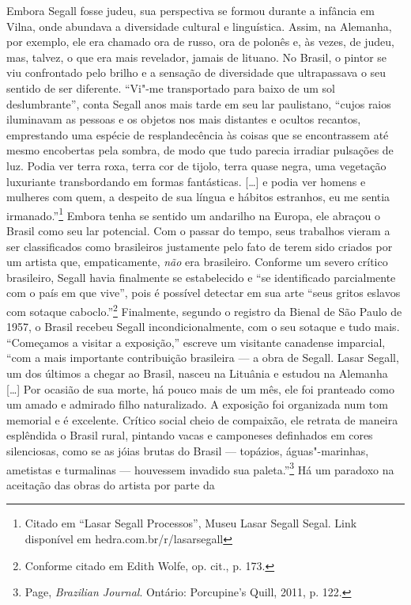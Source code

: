 Embora Segall fosse judeu, sua perspectiva se formou durante a infância
em Vilna, onde abundava a diversidade cultural e linguística. Assim, na
Alemanha, por exemplo, ele era chamado ora de russo, ora de polonês e,
às vezes, de judeu, mas, talvez, o que era mais revelador, jamais de
lituano. No Brasil, o pintor se viu confrontado pelo brilho e a sensação
de diversidade que ultrapassava o seu sentido de ser diferente. ``Vi"-me
transportado para baixo de um sol deslumbrante'', conta Segall anos mais
tarde em seu lar paulistano, ``cujos raios iluminavam as pessoas e os
objetos nos mais distantes e ocultos recantos, emprestando uma espécie
de resplandecência às coisas que se encontrassem até mesmo encobertas
pela sombra, de modo que tudo parecia irradiar pulsações de luz. Podia
ver terra roxa, terra cor de tijolo, terra quase negra, uma vegetação
luxuriante transbordando em formas fantásticas. {[}\ldots{}{]} e podia
ver homens e mulheres com quem, a despeito de sua língua e hábitos
estranhos, eu me sentia irmanado.''\footnote{Citado em ``Lasar Segall
  Processos'', Museu Lasar Segall Segal. Link disponível em hedra.com.br/r/lasarsegall} Embora tenha se sentido um andarilho na
Europa, ele abraçou o Brasil como seu lar potencial. Com o passar do
tempo, seus trabalhos vieram a ser classificados como brasileiros
justamente pelo fato de terem sido criados por um artista que,
empaticamente, \textit{não} era brasileiro. Conforme um severo crítico
brasileiro, Segall havia finalmente se estabelecido e ``se identificado
parcialmente com o país em que vive'', pois é possível detectar em sua
arte ``seus gritos eslavos com sotaque caboclo.''\footnote{Conforme
  citado em Edith Wolfe, op. cit., p. 173.} Finalmente, segundo o registro da Bienal
de São Paulo de 1957, o Brasil recebeu Segall incondicionalmente, com o
seu sotaque e tudo mais. ``Começamos a visitar a exposição,'' escreve um
visitante canadense imparcial, ``com a mais importante contribuição
brasileira --- a obra de Segall. Lasar Segall, um dos últimos a chegar ao
Brasil, nasceu na Lituânia e estudou na Alemanha {[}\ldots{}{]} Por
ocasião de sua morte, há pouco mais de um mês, ele foi pranteado como um
amado e admirado filho naturalizado. A exposição foi organizada num tom
memorial e é excelente. Crítico social cheio de compaixão, ele retrata
de maneira esplêndida o Brasil rural, pintando vacas e camponeses
definhados em cores silenciosas, como se as jóias brutas do Brasil ---
topázios, águas"-marinhas, ametistas e turmalinas --- houvessem invadido
sua paleta.''\footnote{ Page, \textit{Brazilian Journal}. Ontário: Porcupine's Quill, 2011, p.
  122.} Há um paradoxo na aceitação das obras do artista por parte da
